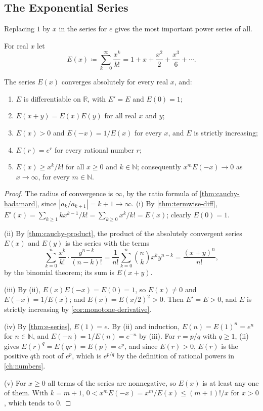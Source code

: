 \subsection{The Exponential Series}

Replacing $1$ by $x$ in the series for $e$ gives the most important power series of all.

\begin{definition}
\label{def:exp-series}
For real $x$ let
\[
E(x)\coloneqq\sum_{k=0}^\infty\frac{x^k}{k!}=1+x+\frac{x^2}2+\frac{x^3}6+\cdots .
\]
\end{definition}

\begin{theorem}
\label{thm:exp-series}
The series $E(x)$ converges absolutely for every real $x$, and:
\begin{enumerate}
\item $E$ is differentiable on $\mathbb R$, with $E'=E$ and $E(0)=1$;
\item $E(x+y)=E(x)E(y)$ for all real $x$ and $y$;
\item $E(x)>0$ and $E(-x)=1/E(x)$ for every $x$, and $E$ is strictly increasing;
\item $E(r)=e^r$ for every rational number $r$;
\item $E(x)\ge x^k/k!$ for all $x\ge0$ and $k\in\mathbb N$; consequently $x^mE(-x)\to0$ as $x\to\infty$, for every $m\in\mathbb N$.
\end{enumerate}
\end{theorem}

\begin{proof}
The radius of convergence is $\infty$, by the ratio formula of \cref{thm:cauchy-hadamard}, since $|a_k/a_{k+1}|=k+1\to\infty$. (i) By \cref{thm:termwise-diff}, $E'(x)=\sum_{k\ge1}kx^{k-1}/k!=\sum_{k\ge0}x^k/k!=E(x)$; clearly $E(0)=1$.

(ii) By \cref{thm:cauchy-product}, the product of the absolutely convergent series $E(x)$ and $E(y)$ is the series with the terms
\[
\sum_{k=0}^n\frac{x^k}{k!}\cdot\frac{y^{n-k}}{(n-k)!}=\frac1{n!}\sum_{k=0}^n\binom nkx^ky^{n-k}=\frac{(x+y)^n}{n!},
\]
by the binomial theorem; its sum is $E(x+y)$.

(iii) By (ii), $E(x)E(-x)=E(0)=1$, so $E(x)\ne0$ and $E(-x)=1/E(x)$; and $E(x)=E(x/2)^2>0$. Then $E'=E>0$, and $E$ is strictly increasing by \cref{cor:monotone-derivative}.

(iv) By \cref{thm:e-series}, $E(1)=e$. By (ii) and induction, $E(n)=E(1)^n=e^n$ for $n\in\mathbb N$, and $E(-n)=1/E(n)=e^{-n}$ by (iii). For $r=p/q$ with $q\ge1$, (ii) gives $E(r)^q=E(qr)=E(p)=e^p$, and since $E(r)>0$, $E(r)$ is the positive $q$th root of $e^p$, which is $e^{p/q}$ by the definition of rational powers in \cref{ch:numbers}.

(v) For $x\ge0$ all terms of the series are nonnegative, so $E(x)$ is at least any one of them. With $k=m+1$, $0<x^mE(-x)=x^m/E(x)\le(m+1)!/x$ for $x>0$, which tends to $0$.
\end{proof}

